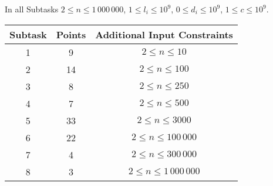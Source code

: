 In all Subtasks $2 \le n \le 1\,000\,000$, $1 \le l_i \le 10^9$, $0 \le d_i \le 10^9$, $1 \le c \le 10^9$.

\begin{center}
\renewcommand{\arraystretch}{1.5}
\begin{tabular}{|c|c|c|}
\hline
Subtask & Points & Additional Input Constraints\\
\hline
1 & 9 & $2 \le n \le 10$ \\
\hline
2 & 14 & $2 \le n \le 100$ \\
\hline
3 & 8 & $2 \le n \le 250$ \\
\hline
4 & 7 & $2 \le n \le 500$ \\
\hline
5 & 33 & $2 \le n \le 3000$ \\
\hline
6 & 22 & $2 \le n \le 100\,000$ \\
\hline
7 & 4 & $2 \le n \le 300\,000$ \\
\hline
8 & 3 & $2 \le n \le 1\,000\,000$ \\
\hline
\end{tabular}
\end{center}